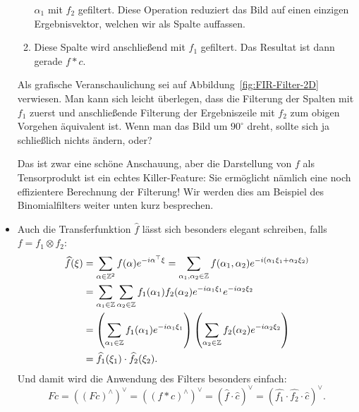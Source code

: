 \begin{remark}
\begin{itemize}
\begin{enumerate}
    $ \alpha_{1} $ mit $ f_{2} $ gefiltert. Diese Operation reduziert das Bild auf einen
    einzigen Ergebnisvektor, welchen wir als Spalte auffassen.
  \item Diese Spalte wird anschließend mit $ f_{1} $ gefiltert. Das Resultat ist dann gerade 
    $ f * c $.
  \end{enumerate}
  Als grafische Veranschaulichung sei auf Abbildung~\ref{fig:FIR-Filter-2D} verwiesen. Man kann
  sich leicht überlegen, dass die Filterung der Spalten mit $ f_{1} $ zuerst und anschließende
  Filterung der Ergebniszeile mit $ f_{2} $ zum obigen Vorgehen äquivalent ist. Wenn man das Bild um
  $ 90^{\circ} $ dreht, sollte sich ja schließlich nichts ändern, oder?
  
  Das ist zwar eine schöne Anschauung, aber die Darstellung von $ f $ als Tensorprodukt ist ein
  echtes Killer-Feature: Sie ermöglicht nämlich eine noch effizientere Berechnung der Filterung!
  Wir werden dies am Beispiel des Binomialfilters weiter unten kurz besprechen.
\item Auch die Transferfunktion $ \widehat{f} $ lässt sich besonders elegant schreiben, falls
  $ f = f_{1} \otimes f_{2} $:
  \begin{align*}
     \widehat{f}(\xi)
  &= \sum_{\alpha \in \mathbb{Z}^{2}} f(\alpha) e^{-i \alpha^{\top} \xi}
   = \sum_{\alpha_{1}, \alpha_{2} \in \mathbb{Z}} 
       f(\alpha_{1}, \alpha_{2}) e^{-i (\alpha_{1}\xi_{1} + \alpha_{2}\xi_{2})} \\
  &= \sum_{\alpha_{1} \in \mathbb{Z}} \sum_{\alpha_{2} \in \mathbb{Z}} 
        f_{1}(\alpha_{1}) f_{2}(\alpha_{2}) e^{-i\alpha_{1}\xi_{1}} e^{-i\alpha_{2}\xi_{2}} \\
  &= \left( \sum_{\alpha_{1} \in \mathbb{Z}} f_{1}(\alpha_{1}) e^{-i\alpha_{1}\xi_{1}} \right)
        \left( \sum_{\alpha_{2} \in \mathbb{Z}} f_{2}(\alpha_{2}) e^{-i\alpha_{2}\xi_{2}} \right) \\
  &= \widehat{f_{1}}(\xi_{1}) \cdot \widehat{f_{2}}(\xi_{2}).
  \end{align*}
  Und damit wird die Anwendung des Filters besonders einfach:
  \[
      Fc
    = \left( (Fc)^{\wedge} \right)^{\vee}
    = \left( (f * c)^{\wedge} \right)^{\vee}
    = \left( \widehat{f} \cdot \widehat{c} \right)^{\vee}
    = \left( \widehat{f_{1}} \cdot \widehat{f_{2}} \cdot \widehat{c} \right)^{\vee}.
  \]
\end{itemize}
\begin{figure}[ht]
\centering
{}
\end{figure}
\end{remark}
